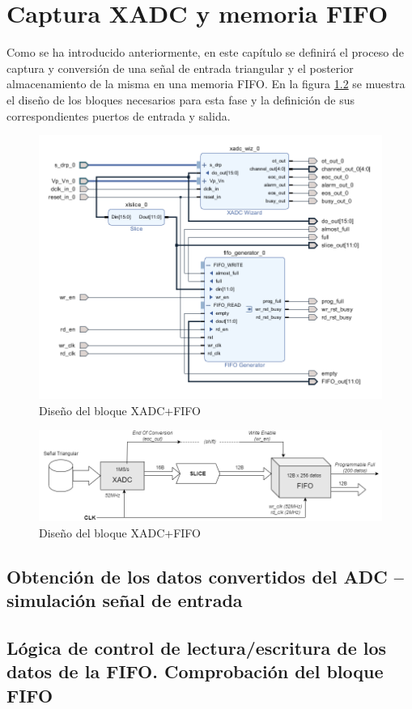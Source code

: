 \chapter{Captura XADC y memoria FIFO}
\label{section:xadc_fifo}


Como se ha introducido anteriormente, en este capítulo se definirá el proceso de captura y conversión de una señal de entrada triangular y el posterior almacenamiento de la misma en una memoria FIFO. En la figura \ref{fig:xadc_fifo} se muestra el diseño de los bloques necesarios para esta fase y la definición de sus correspondientes puertos de entrada y salida.

\vspace{3mm}

    \begin{figure}[h]
    	\centering
    	\includegraphics[width=1\textwidth]{img/diseno/xadc_fifo.PNG}
    	\caption{Diseño del bloque XADC+FIFO}
    	\label{fig:xadc_fifo}
    \end{figure}
    
\vspace{3mm}

\vspace{3mm}

    \begin{figure}[h]
    	\centering
    	\includegraphics[width=1\textwidth]{img/diseno/xadc_fifo.drawio.PNG}
    	\caption{Diseño del bloque XADC+FIFO}
    	\label{fig:xadc_fifo}
    \end{figure}
    
\vspace{3mm}


\section{Obtención de los datos convertidos del ADC – simulación señal de entrada}



\section{Lógica de control de lectura/escritura de los datos de la FIFO. Comprobación del bloque FIFO}